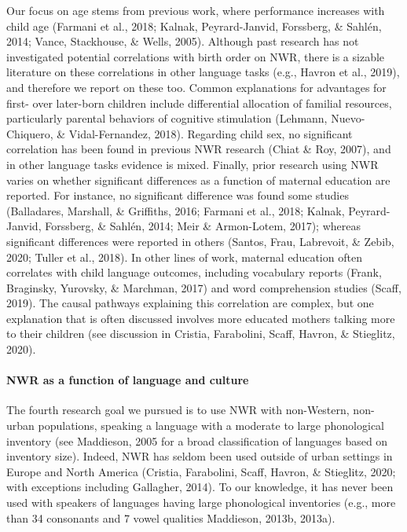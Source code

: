 \documentclass[
  american,
  ,man,floatsintext]{apa6}
\let\oldparagraph\paragraph
\renewcommand{\paragraph}[1]{\oldparagraph{#1}\mbox{}}
\begin{document}
Our focus on age stems from previous work, where performance increases with child age (Farmani et al., 2018; Kalnak, Peyrard-Janvid, Forssberg, \& Sahlén, 2014; Vance, Stackhouse, \& Wells, 2005). Although past research has not investigated potential correlations with birth order on NWR, there is a sizable literature on these correlations in other language tasks (e.g., Havron et al., 2019), and therefore we report on these too. Common explanations for advantages for first- over later-born children include differential allocation of familial resources, particularly parental behaviors of cognitive stimulation (Lehmann, Nuevo-Chiquero, \& Vidal-Fernandez, 2018). Regarding child sex, no significant correlation has been found in previous NWR research (Chiat \& Roy, 2007), and in other language tasks evidence is mixed. Finally, prior research using NWR varies on whether significant differences as a function of maternal education are reported. For instance, no significant difference was found some studies (Balladares, Marshall, \& Griffiths, 2016; Farmani et al., 2018; Kalnak, Peyrard-Janvid, Forssberg, \& Sahlén, 2014; Meir \& Armon-Lotem, 2017); whereas significant differences were reported in others (Santos, Frau, Labrevoit, \& Zebib, 2020; Tuller et al., 2018). In other lines of work, maternal education often correlates with child language outcomes, including vocabulary reports (Frank, Braginsky, Yurovsky, \& Marchman, 2017) and word comprehension studies (Scaff, 2019). The causal pathways explaining this correlation are complex, but one explanation that is often discussed involves more educated mothers talking more to their children (see discussion in Cristia, Farabolini, Scaff, Havron, \& Stieglitz, 2020).

\hypertarget{nwr-as-a-function-of-language-and-culture}{%
\paragraph{NWR as a function of language and culture}\label{nwr-as-a-function-of-language-and-culture}}

The fourth research goal we pursued is to use NWR with non-Western, non-urban populations, speaking a language with a moderate to large phonological inventory (see Maddieson, 2005 for a broad classification of languages based on inventory size). Indeed, NWR has seldom been used outside of urban settings in Europe and North America (Cristia, Farabolini, Scaff, Havron, \& Stieglitz, 2020; with exceptions including Gallagher, 2014). To our knowledge, it has never been used with speakers of languages having large phonological inventories (e.g., more than 34 consonants and 7 vowel qualities Maddieson, 2013b, 2013a).
\end{document}

